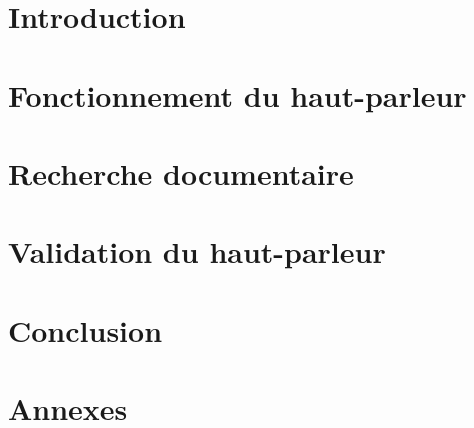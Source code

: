 \documentclass{report}
\begin{document}





\clearpage
\tableofcontents
\clearpage

\chapter{Introduction}



\chapter{Fonctionnement du haut-parleur}


\clearpage


\clearpage


\clearpage


\clearpage



\chapter{Recherche documentaire}


\clearpage



\chapter{Validation du haut-parleur}



\chapter{Conclusion}




\nocite{*}


\chapter{Annexes}


\clearpage


\clearpage


\clearpage


\clearpage


\end{document}
